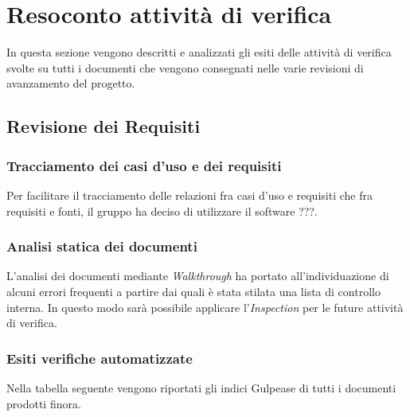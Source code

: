 \section{Resoconto attività di verifica}
In questa sezione vengono descritti e analizzati gli esiti delle attività
di verifica svolte su tutti i documenti che vengono consegnati nelle varie 
revisioni di avanzamento del progetto.

\subsection{Revisione dei Requisiti}
\subsubsection{Tracciamento dei casi d'uso e dei requisiti}
Per facilitare il tracciamento delle relazioni fra casi d'uso e requisiti che
fra requisiti e fonti, il gruppo ha deciso di utilizzare il software ???.

\subsubsection{Analisi statica dei documenti}
L'analisi dei documenti mediante \textit{Walkthrough}\glo{} ha portato 
all'individuazione di alcuni errori frequenti a partire dai quali è stata 
stilata una lista di controllo interna. In questo modo sarà possibile applicare
l'\textit{Inspection}\glo{} per le future attività di verifica.

\subsubsection{Esiti verifiche automatizzate}
Nella tabella seguente vengono riportati gli indici Gulpease\glo{} di tutti
i documenti prodotti finora.

